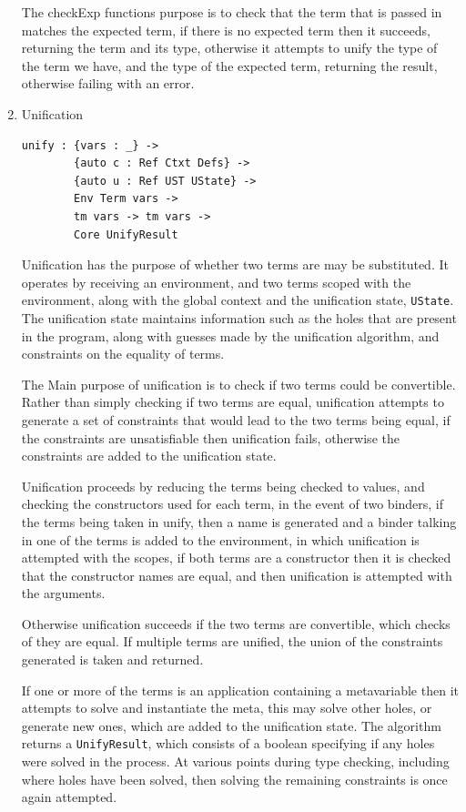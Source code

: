 \documentclass[a4paper]{article}
\begin{document}
\begin{enumerate}
The checkExp functions purpose is to check that the term that is passed
in matches the expected term, if there is no expected term then it 
succeeds, returning the term and its type, otherwise it attempts to 
unify the type of the term we have, and the type of the expected term, 
returning the result, otherwise failing with an error. 

\item Unification
\label{sec:org292bf4c}

\begin{center}
\begin{verbatim}
unify : {vars : _} ->
		{auto c : Ref Ctxt Defs} ->
		{auto u : Ref UST UState} ->
		Env Term vars ->
		tm vars -> tm vars ->
		Core UnifyResult
\end{verbatim}
\end{center}
Unification has the purpose of whether two terms are may be substituted. 
It operates by receiving an environment, and two terms scoped 
with the environment, along with the global context and the unification
state, \texttt{UState}. The unification state maintains information such as 
the holes that are present in the program, along with guesses made by 
the unification algorithm, and constraints on the equality of terms.

The Main purpose of unification is to check if two terms could be 
convertible. Rather than simply checking if two terms are equal, 
unification attempts to generate a set of constraints that would lead 
to the two terms being equal, if the constraints are unsatisfiable then
unification fails, otherwise the constraints are added to the
unification state. 

Unification proceeds by reducing the terms being checked to values, and
checking the constructors used for each term, in the event of two binders, 
if the terms being taken in unify, then a name is generated and a 
binder talking in one of the terms is added to the environment, in which
unification is attempted with the scopes, if both terms are a constructor
then it is checked that the constructor names are equal, and then unification
is attempted with the arguments. 

Otherwise unification succeeds if the two terms are convertible, which
checks of they are equal. If multiple terms are unified, the union of the
constraints generated is taken and returned.  

If one or more of the terms is an application containing a metavariable
then it attempts to solve and instantiate the meta, this may solve other 
holes, or generate new ones, which are added to the unification state. 
The algorithm returns a \texttt{UnifyResult}, which consists of a boolean 
specifying if any holes were solved in the process. At various points 
during type checking, including where holes have been solved, then 
solving the remaining constraints is once again attempted. 


\end{enumerate}
\end{document}
